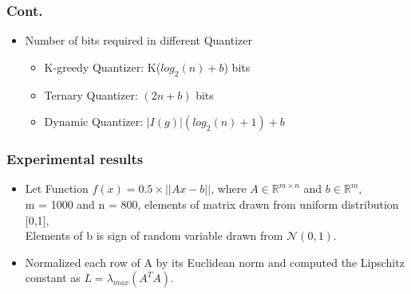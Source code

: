 \documentclass{beamer}
\begin{document}
\begin{frame}
\frametitle{Cont.}
\begin{itemize}
\item Number of bits required in different Quantizer
\begin{itemize}
\item K-greedy Quantizer: K($log_2(n) + b$) bits
\item Ternary Quantizer: $(2n+b)$ bits
\item 
Dynamic Quantizer: $|I(g)|(log_2(n)+1) + b$

\end{itemize}
\end{itemize}
\end{frame}

\begin{frame}
\frametitle{Experimental results}
\begin{itemize}
\item
Let Function $f(x) = 0.5 \times ||Ax-b||$, where $A \in \mathbb{R}^{m \times n}$ and $b \in \mathbb{R}^{m}$, \\
m = 1000 and n = 800, elements of matrix drawn from uniform distribution [0,1],\\ Elements of b is sign of random variable drawn from $\mathcal{N}({0,1})$.\\
\item
Normalized each row of A by its Euclidean norm and
computed the Lipschitz constant as $L =  \lambda_{max} (A^T A)$.  

\end{itemize}
\end{frame}
\end{document}
